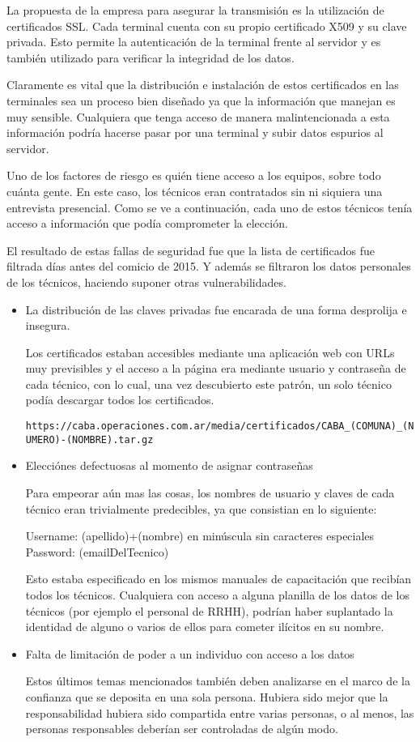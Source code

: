 La propuesta de la empresa para asegurar la transmisión es la utilización de certificados SSL. Cada terminal cuenta con su propio certificado X509 y su clave privada. Esto permite la autenticación de la terminal frente al servidor y es también utilizado para verificar la integridad de los datos.

Claramente es vital que la distribución e instalación de estos certificados en las terminales sea un proceso bien diseñado ya que la información que manejan es muy sensible. Cualquiera que tenga acceso de manera malintencionada a esta información podría hacerse pasar por una terminal y subir datos espurios al servidor.

Uno de los factores de riesgo es quién tiene acceso a los equipos, sobre todo cuánta gente. En este caso, los técnicos eran contratados sin ni siquiera una entrevista presencial. Como se ve a continuación, cada uno de estos técnicos tenía acceso a información que podía comprometer la elección\cite{smaldone}.

El resultado de estas fallas de seguridad fue que la lista de certificados fue filtrada días antes del comicio de 2015. Y además se filtraron los datos personales de los técnicos, haciendo suponer otras vulnerabilidades.

\begin{itemize}
\item La distribución de las claves privadas fue encarada de una forma desprolija e insegura.

Los certificados estaban accesibles mediante una aplicación web con URLs muy previsibles y el acceso a la página era mediante usuario y contraseña de cada técnico, con lo cual, una vez descubierto este patrón, un solo técnico podía descargar todos los certificados.

\texttt{https://caba.operaciones.com.ar/media/certificados/CABA\_(COMUNA)\_(NUMERO)-(NOMBRE).tar.gz}

\item Elecciónes defectuosas al momento de asignar contraseñas

Para empeorar aún mas las cosas, los nombres de usuario y claves de cada técnico eran trivialmente predecibles, ya que consistian en lo siguiente:

Username: (apellido)+(nombre) en minúscula sin caracteres especiales\\
Password: (emailDelTecnico)

Esto estaba especificado en los mismos manuales de capacitación que recibían todos los técnicos. Cualquiera con acceso a alguna planilla de los datos de los técnicos (por ejemplo el personal de RRHH), podrían haber suplantado la identidad de alguno o varios de ellos para cometer ilícitos en su nombre.

\item Falta de limitación de poder a un individuo con acceso a los datos

Estos últimos temas mencionados también deben analizarse en el marco de la confianza que se deposita en una sola persona. Hubiera sido mejor que la responsabilidad hubiera sido compartida entre varias personas, o al menos, las personas responsables deberían ser controladas de algún modo.
\end{itemize}

